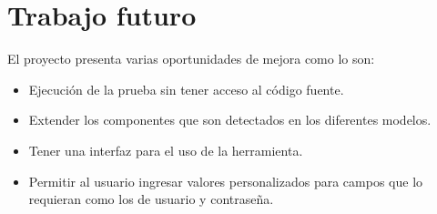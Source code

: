 \section{Trabajo futuro}

El proyecto presenta varias oportunidades de mejora como lo son:

\begin{itemize}
	\item Ejecución de la prueba sin tener acceso al código fuente.
	\item Extender los componentes que son detectados en los diferentes modelos.
	\item Tener una interfaz para el uso de la herramienta.
	\item Permitir al usuario ingresar valores personalizados para campos que lo requieran como los de usuario y contraseña.
	
	
\end{itemize}

